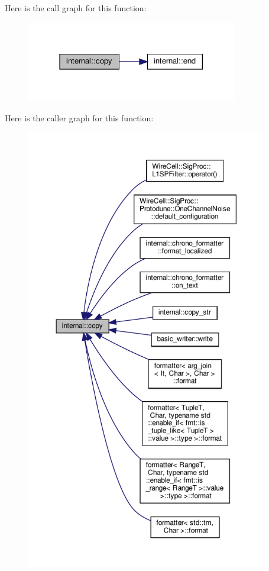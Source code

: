 Here is the call graph for this function\+:
\nopagebreak
\begin{figure}[H]
\begin{center}
\leavevmode
\includegraphics[width=261pt]{namespaceinternal_a03b2086b2426ff3ecfce2d6fd22b66dc_cgraph}
\end{center}
\end{figure}
Here is the caller graph for this function\+:
\nopagebreak
\begin{figure}[H]
\begin{center}
\leavevmode
\includegraphics[height=550pt]{namespaceinternal_a03b2086b2426ff3ecfce2d6fd22b66dc_icgraph}
\end{center}
\end{figure}
\mbox{\label{namespaceinternal_ae7d6dd5299686c1c18bb12d34b574362}} 
